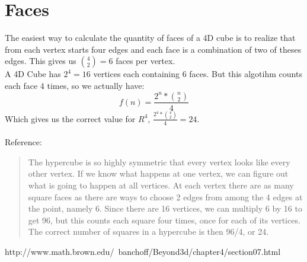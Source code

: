 \documentclass[12pt]{article}
\begin{document}
	\section{Faces}
	The easiest way to calculate the quantity of faces of a 4D cube is to realize that from each vertex starts four edges and each face is a combination of two of theses edges. This gives us ${4 \choose 2}=6$ faces per vertex.\\
	A 4D Cube has $2^4=16$ vertices each containing 6 faces. But this algotihm counts each face 4 times, so we actually have:
	$$f(n) = \frac{2^n*{n \choose 2}}{4}$$
	Which gives us the correct value for $R^4$, $\frac{2^4*{4 \choose 2}}{4}=24$.\\
	\\	
	Reference:\\
	\begin{quote}
		The hypercube is so highly symmetric that every vertex looks like every other vertex. If we know what happens at one vertex, we can figure out what is going to happen at all vertices. At each vertex there are as many square faces as there are ways to choose 2 edges from among the 4 edges at the point, namely 6. Since there are 16 vertices, we can multiply 6 by 16 to get 96, but this counts each square four times, once for each of its vertices. The correct number of squares in a hypercube is then 96/4, or 24.
	\end{quote}
	http://www.math.brown.edu/~banchoff/Beyond3d/chapter4/section07.html
\end{document}
